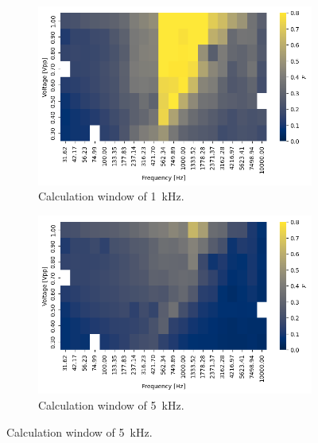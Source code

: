 \documentclass[a4paper,twoside,11pt]{report}
\begin{document}
\begin{appendices}
  \begin{figure}[ht]
    \centering
    \begin{subfigure}{.5\textwidth}
      \centering
      \includegraphics[width=.9\linewidth]{sdfs/off_1.png}
      \caption{Calculation window of \qty{1}{\kilo\hertz}.}
      \label{fig:sdf_off_1}
    \end{subfigure}%
    \begin{subfigure}{.5\textwidth}
      \centering
      \includegraphics[width=.9\linewidth]{sdfs/off_5.png}
      \caption{Calculation window of \qty{5}{\kilo\hertz}.}
      \label{fig:sdf_off_5}
    \end{subfigure}
    

\end{figure}
\end{appendices}
\end{document}
